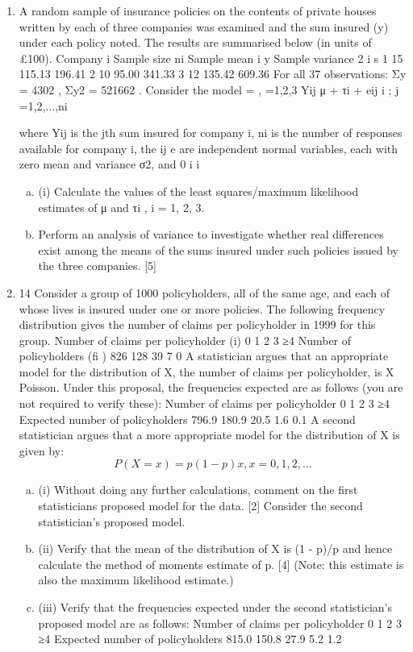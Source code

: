 \documentclass[a4paper,12pt]{article}
\begin{document}
\begin{enumerate}
\item A random sample of insurance policies on the contents of private houses written
by each of three companies was examined and the sum insured (y) under each
policy noted. The results are summarised below (in units of £100).
Company
i
Sample size
ni
Sample mean
i y
Sample variance
2
i s
1 15 115.13 196.41
2 10 95.00 341.33
3 12 135.42 609.36
For all 37 observations: Σy = 4302 , Σy2 = 521662 .
Consider the model
= , =1,2,3 Yij μ + τi + eij i ; j =1,2,...,ni

where Yij is the jth sum insured for company i, ni is the number of responses
available for company i, the ij e are independent normal variables, each with zero
mean and variance σ2, and 0 i i

\begin{enumerate}[(a)]
    \item (i) Calculate the values of the least squares/maximum likelihood estimates of
μ and τi , i = 1, 2, 3. 
\item Perform an analysis of variance to investigate whether real differences
exist among the means of the sums insured under such policies issued by
the three companies. [5]
\end{enumerate}
\item 
14 Consider a group of 1000 policyholders, all of the same age, and each of whose
lives is insured under one or more policies. The following frequency distribution
gives the number of claims per policyholder in 1999 for this group.
Number of claims per policyholder (i) 0 1 2 3 ≥4
Number of policyholders (fi ) 826 128 39 7 0
A statistician argues that an appropriate model for the distribution of X, the
number of claims per policyholder, is X ~ Poisson. Under this proposal, the
frequencies expected are as follows (you are not required to verify these):
Number of claims per policyholder 0 1 2 3 ≥4
Expected number of policyholders 796.9 180.9 20.5 1.6 0.1
A second statistician argues that a more appropriate model for the distribution of
X is given by:
\[P(X = x) = p(1 − p)x , x = 0, 1, 2,\ldots\]
\begin{enumerate}[(a)]
    \item (i) Without doing any further calculations, comment on the first statisticians
proposed model for the data. [2]
Consider the second statistician's proposed model.
\item (ii) Verify that the mean of the distribution of X is (1 \;-\; p)/p and hence
calculate the method of moments estimate of p. [4]
(Note: this estimate is also the maximum likelihood estimate.)
\item (iii) Verify that the frequencies expected under the second statistician's
proposed model are as follows:
Number of claims per policyholder 0 1 2 3 ≥4
Expected number of policyholders 815.0 150.8 27.9 5.2 1.2


\end{enumerate}
\end{enumerate}
\end{document}
